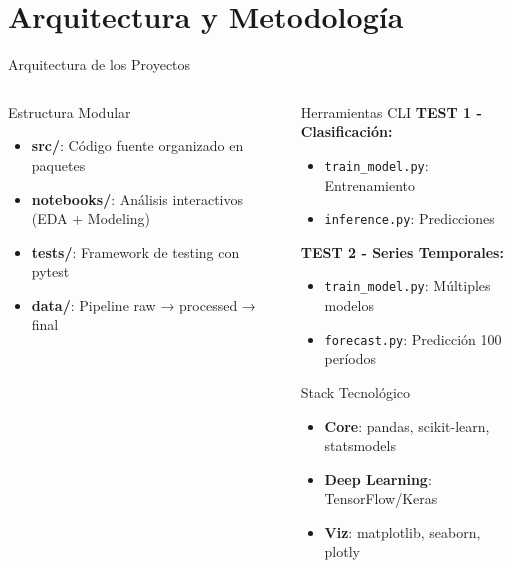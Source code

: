 \documentclass[aspectratio=169]{beamer}
\begin{document}
\section{Arquitectura y Metodología}

\begin{frame}{Arquitectura de los Proyectos}
    \begin{columns}[T]
        \begin{column}{0.48\textwidth}
            \begin{block}{Estructura Modular}
                \begin{itemize}
                    \item \textbf{src/}: Código fuente organizado en paquetes
                    \item \textbf{notebooks/}: Análisis interactivos (EDA + Modeling)
                    \item \textbf{tests/}: Framework de testing con pytest
                    \item \textbf{data/}: Pipeline raw → processed → final
                \end{itemize}
            \end{block}
        \end{column}
        
        \begin{column}{0.48\textwidth}
            \begin{exampleblock}{Herramientas CLI}
                \textbf{TEST 1 - Clasificación:}
                \begin{itemize}
                    \item \texttt{train\_model.py}: Entrenamiento
                    \item \texttt{inference.py}: Predicciones
                \end{itemize}
                
                \textbf{TEST 2 - Series Temporales:}
                \begin{itemize}
                    \item \texttt{train\_model.py}: Múltiples modelos
                    \item \texttt{forecast.py}: Predicción 100 períodos
                \end{itemize}
            \end{exampleblock}
            
            \begin{block}{Stack Tecnológico}
                \begin{itemize}
                    \item \textbf{Core}: pandas, scikit-learn, statsmodels
                    \item \textbf{Deep Learning}: TensorFlow/Keras
                    \item \textbf{Viz}: matplotlib, seaborn, plotly
                \end{itemize}
            \end{block}
        \end{column}
    \end{columns}
\end{frame}
\end{document}
